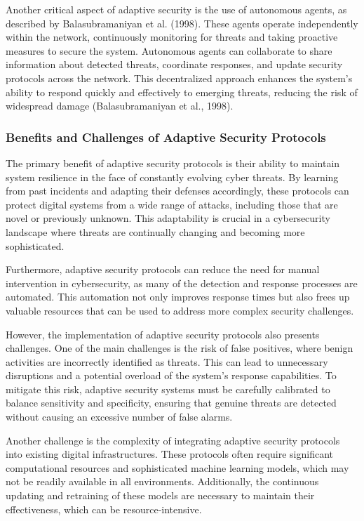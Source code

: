 \documentclass[12pt,twoside]{article}
\begin{document}
Another critical aspect of adaptive security is the use of autonomous agents, as described by Balasubramaniyan et al. (1998). These agents operate independently within the network, continuously monitoring for threats and taking proactive measures to secure the system. Autonomous agents can collaborate to share information about detected threats, coordinate responses, and update security protocols across the network. This decentralized approach enhances the system's ability to respond quickly and effectively to emerging threats, reducing the risk of widespread damage (Balasubramaniyan et al., 1998).

\subsubsection{Benefits and Challenges of Adaptive Security Protocols}

The primary benefit of adaptive security protocols is their ability to maintain system resilience in the face of constantly evolving cyber threats. By learning from past incidents and adapting their defenses accordingly, these protocols can protect digital systems from a wide range of attacks, including those that are novel or previously unknown. This adaptability is crucial in a cybersecurity landscape where threats are continually changing and becoming more sophisticated.

Furthermore, adaptive security protocols can reduce the need for manual intervention in cybersecurity, as many of the detection and response processes are automated. This automation not only improves response times but also frees up valuable resources that can be used to address more complex security challenges.

However, the implementation of adaptive security protocols also presents challenges. One of the main challenges is the risk of false positives, where benign activities are incorrectly identified as threats. This can lead to unnecessary disruptions and a potential overload of the system's response capabilities. To mitigate this risk, adaptive security systems must be carefully calibrated to balance sensitivity and specificity, ensuring that genuine threats are detected without causing an excessive number of false alarms.

Another challenge is the complexity of integrating adaptive security protocols into existing digital infrastructures. These protocols often require significant computational resources and sophisticated machine learning models, which may not be readily available in all environments. Additionally, the continuous updating and retraining of these models are necessary to maintain their effectiveness, which can be resource-intensive.
\end{document}
